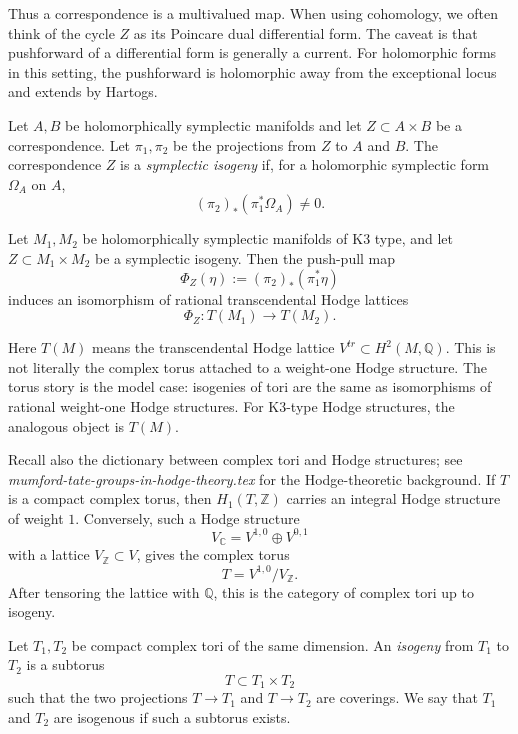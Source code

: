 \documentclass{book}
\begin{document}
\noindent
Thus a correspondence is a multivalued map.
When using cohomology, we often think of the
cycle $Z$ as its Poincare dual differential
form. The caveat is that pushforward of a
differential form is generally a current.
For holomorphic forms in this setting, the
pushforward is holomorphic away from the
exceptional locus and extends by Hartogs.

\begin{definition}
\label{definition-symplectic-isogeny}
Let $A,B$ be holomorphically symplectic
manifolds and let
$Z\subset A\times B$ be a correspondence.
Let $\pi_1,\pi_2$ be the projections from
$Z$ to $A$ and $B$.
The correspondence $Z$ is a
{\it symplectic isogeny} if, for a
holomorphic symplectic form $\Omega_A$ on
$A$,
$$
(\pi_2)_*(\pi_1^*\Omega_A)\neq 0.
$$
\end{definition}

\begin{lemma}
\label{lemma-sympl-isog-transcendental}
Let $M_1,M_2$ be holomorphically symplectic
manifolds of K3 type, and let
$Z\subset M_1\times M_2$ be a symplectic
isogeny.
Then the push-pull map
$$
\Phi_Z(\eta):=(\pi_2)_*(\pi_1^*\eta)
$$
induces an isomorphism of rational
transcendental Hodge lattices
$$
\Phi_Z:T(M_1)\longrightarrow T(M_2).
$$
\end{lemma}

\noindent
Here $T(M)$ means the transcendental Hodge
lattice $V^{tr}\subset H^2(M,\mathbb{Q})$.
This is not literally the complex torus
attached to a weight-one Hodge structure.
The torus story is the model case: isogenies
of tori are the same as isomorphisms of
rational weight-one Hodge structures.
For K3-type Hodge structures, the analogous
object is $T(M)$.

\medskip
Recall also the dictionary between complex
tori and Hodge structures; see
{\it mumford-tate-groups-in-hodge-theory.tex}
for the Hodge-theoretic background.
If $T$ is a compact complex torus, then
$H_1(T,\mathbb{Z})$ carries an integral
Hodge structure of weight $1$.
Conversely, such a Hodge structure
$$
V_{\mathbb{C}}=V^{1,0}\oplus V^{0,1}
$$
with a lattice $V_{\mathbb{Z}}\subset V$,
gives the complex torus
$$
T=V^{1,0}/V_{\mathbb{Z}}.
$$
After tensoring the lattice with
$\mathbb{Q}$, this is the category of
complex tori up to isogeny.

\begin{definition}
\label{definition-isogeny-tori}
Let $T_1,T_2$ be compact complex tori of the
same dimension.
An {\it isogeny} from $T_1$ to $T_2$ is a
subtorus
$$
T\subset T_1\times T_2
$$
such that the two projections
$T\to T_1$ and $T\to T_2$ are coverings.
We say that $T_1$ and $T_2$ are isogenous
if such a subtorus exists.
\end{definition}
\end{document}
